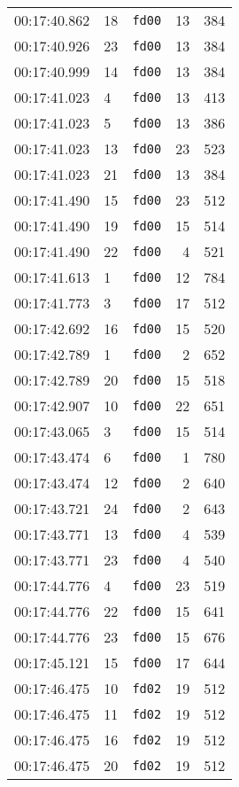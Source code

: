 \documentclass{article}
\begin{document}
\begin{longtable}{lllrr}
00:17:40.862 & 18 & \texttt{fd00} & 13 & 384 \\
00:17:40.926 & 23 & \texttt{fd00} & 13 & 384 \\
00:17:40.999 & 14 & \texttt{fd00} & 13 & 384 \\
00:17:41.023 & 4 & \texttt{fd00} & 13 & 413 \\
00:17:41.023 & 5 & \texttt{fd00} & 13 & 386 \\
00:17:41.023 & 13 & \texttt{fd00} & 23 & 523 \\
00:17:41.023 & 21 & \texttt{fd00} & 13 & 384 \\
00:17:41.490 & 15 & \texttt{fd00} & 23 & 512 \\
00:17:41.490 & 19 & \texttt{fd00} & 15 & 514 \\
00:17:41.490 & 22 & \texttt{fd00} & 4 & 521 \\
00:17:41.613 & 1 & \texttt{fd00} & 12 & 784 \\
00:17:41.773 & 3 & \texttt{fd00} & 17 & 512 \\
00:17:42.692 & 16 & \texttt{fd00} & 15 & 520 \\
00:17:42.789 & 1 & \texttt{fd00} & 2 & 652 \\
00:17:42.789 & 20 & \texttt{fd00} & 15 & 518 \\
00:17:42.907 & 10 & \texttt{fd00} & 22 & 651 \\
00:17:43.065 & 3 & \texttt{fd00} & 15 & 514 \\
00:17:43.474 & 6 & \texttt{fd00} & 1 & 780 \\
00:17:43.474 & 12 & \texttt{fd00} & 2 & 640 \\
00:17:43.721 & 24 & \texttt{fd00} & 2 & 643 \\
00:17:43.771 & 13 & \texttt{fd00} & 4 & 539 \\
00:17:43.771 & 23 & \texttt{fd00} & 4 & 540 \\
00:17:44.776 & 4 & \texttt{fd00} & 23 & 519 \\
00:17:44.776 & 22 & \texttt{fd00} & 15 & 641 \\
00:17:44.776 & 23 & \texttt{fd00} & 15 & 676 \\
00:17:45.121 & 15 & \texttt{fd00} & 17 & 644 \\
00:17:46.475 & 10 & \texttt{fd02} & 19 & 512 \\
00:17:46.475 & 11 & \texttt{fd02} & 19 & 512 \\
00:17:46.475 & 16 & \texttt{fd02} & 19 & 512 \\
00:17:46.475 & 20 & \texttt{fd02} & 19 & 512 \\

\end{longtable}
\end{document}
